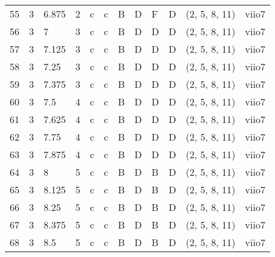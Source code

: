 \begin{tabular}{llllllllllll}
55  & 3       & 6.875  & 2               & c          & c              & B      & D       & F      & D         & (2, 5, 8, 11)    & viio7          \\
56  & 3       & 7      & 3               & c          & c              & B      & D       & D      & D         & (2, 5, 8, 11)    & viio7          \\
57  & 3       & 7.125  & 3               & c          & c              & B      & D       & D      & D         & (2, 5, 8, 11)    & viio7          \\
58  & 3       & 7.25   & 3               & c          & c              & B      & D       & D      & D         & (2, 5, 8, 11)    & viio7          \\
59  & 3       & 7.375  & 3               & c          & c              & B      & D       & D      & D         & (2, 5, 8, 11)    & viio7          \\
60  & 3       & 7.5    & 4               & c          & c              & B      & D       & D      & D         & (2, 5, 8, 11)    & viio7          \\
61  & 3       & 7.625  & 4               & c          & c              & B      & D       & D      & D         & (2, 5, 8, 11)    & viio7          \\
62  & 3       & 7.75   & 4               & c          & c              & B      & D       & D      & D         & (2, 5, 8, 11)    & viio7          \\
63  & 3       & 7.875  & 4               & c          & c              & B      & D       & D      & D         & (2, 5, 8, 11)    & viio7          \\
64  & 3       & 8      & 5               & c          & c              & B      & D       & B      & D         & (2, 5, 8, 11)    & viio7          \\
65  & 3       & 8.125  & 5               & c          & c              & B      & D       & B      & D         & (2, 5, 8, 11)    & viio7          \\
66  & 3       & 8.25   & 5               & c          & c              & B      & D       & B      & D         & (2, 5, 8, 11)    & viio7          \\
67  & 3       & 8.375  & 5               & c          & c              & B      & D       & B      & D         & (2, 5, 8, 11)    & viio7          \\
68  & 3       & 8.5    & 5               & c          & c              & B      & D       & B      & D         & (2, 5, 8, 11)    & viio7          \\

\end{tabular}
